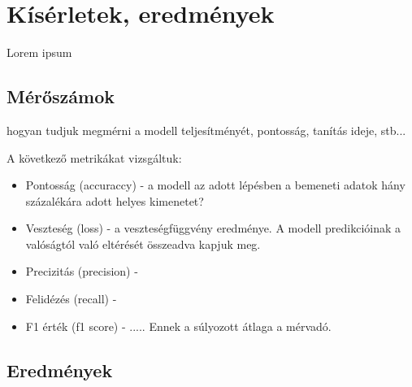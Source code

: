 \chapter{Kísérletek, eredmények} 
\label{ch:results}

Lorem ipsum

\section{Mérőszámok}

hogyan tudjuk megmérni a modell teljesítményét, pontosság, tanítás ideje, stb...

A következő metrikákat vizsgáltuk:

\begin{itemize}
\item Pontosság (accuraccy) - a modell az adott lépésben a bemeneti adatok hány százalékára adott helyes kimenetet?
\item Veszteség (loss) - a veszteségfüggvény eredménye. A modell predikcióinak a valóságtól való eltérését összeadva kapjuk meg.
\item Precizitás (precision) - 
\item Felidézés (recall) - 
\item F1 érték (f1 score) - ..... Ennek a súlyozott átlaga a mérvadó.

\end{itemize}

\section{Eredmények}


